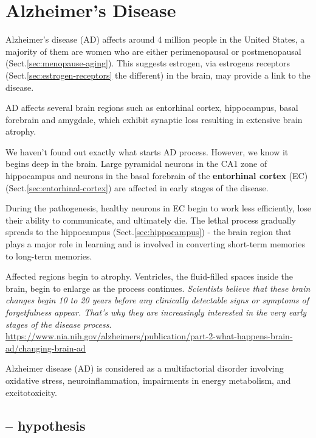 \section{Alzheimer's Disease}
\label{sec:Alzheimer-Disease}


Alzheimer's disease (AD)  affects around 4 million people in the United States,
a majority of them are women who are either perimenopausal or postmenopausal
(Sect.\ref{sec:menopause-aging}). This suggests estrogen, via estrogens
receptors (Sect.\ref{sec:estrogen-receptors} the different) in the brain, may
provide a link to the disease.

AD affects several brain regions such as entorhinal cortex, hippocampus, basal
forebrain and amygdale, which exhibit synaptic loss resulting in extensive brain
atrophy.

We haven't found out exactly what starts AD process. However, we know it begins
deep in the brain. Large pyramidal neurons in the CA1 zone of hippocampus and
neurons in the basal forebrain of the {\bf entorhinal cortex} (EC)
(Sect.\ref{sec:entorhinal-cortex}) are affected in early stages of the disease.

During the pathogenesis, healthy neurons in EC begin to work less efficiently,
lose their ability to communicate, and ultimately die. The lethal process
gradually spreads to the hippocampus (Sect.\ref{sec:hippocampus}) - the brain
region that plays a major role in learning and is involved in converting
short-term memories to long-term memories.

Affected regions begin to atrophy. Ventricles, the fluid-filled spaces inside
the brain, begin to enlarge as the process continues.
{\it Scientists believe that these brain changes begin 10 to 20 years before any
clinically detectable signs or symptoms of forgetfulness appear. That's why they
are increasingly interested in the very early stages of the disease process}.
\url{https://www.nia.nih.gov/alzheimers/publication/part-2-what-happens-brain-ad/changing-brain-ad}

Alzheimer disease (AD) is considered as a multifactorial disorder involving
oxidative stress, neuroinflammation, impairments in energy metabolism, and
excitotoxicity.


\subsection{-- hypothesis}
\label{sec:Alzheimer-hypothesis}



